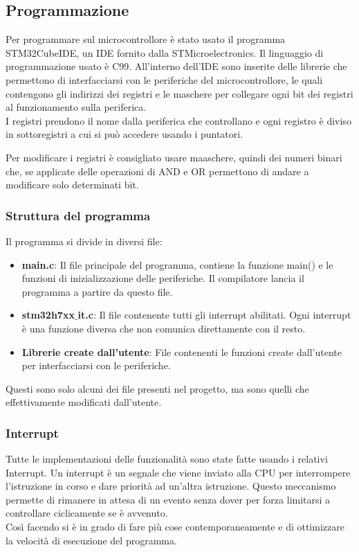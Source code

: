 \pagebreak

\subsection{Programmazione}
Per programmare sul microcontrollore è stato usato il programma STM32CubeIDE, un IDE fornito dalla STMicroelectronics. Il linguaggio di programmazione usato è C99. All'interno dell'IDE sono inserite delle librerie che permettono di interfacciarsi con le periferiche del microcontrollore, le quali contengono gli indirizzi dei registri e le maschere per collegare ogni bit dei registri al funzionamento sulla periferica.\\

I registri prendono il nome dalla periferica che controllano e ogni registro è diviso in sottoregistri a cui si può accedere usando i puntatori.

Per modificare i registri è consigliato usare maaschere, quindi dei numeri binari che, se applicate delle operazioni di AND e OR permettono di andare a modificare solo determinati bit.

\subsubsection{Struttura del programma}
Il programma si divide in diversi file:
\begin{itemize}
    \item \textbf{main.c}: Il file principale del programma, contiene la funzione main() e le funzioni di inizializzazione delle periferiche. Il compilatore lancia il programma a partire da questo file.
    \item \textbf{stm32h7xx$\_$it.c}: Il file contenente tutti gli interrupt abilitati. Ogni interrupt è una funzione diversa che non comunica direttamente con il resto.
    \item \textbf{Librerie create dall'utente}: File contenenti le funzioni create dall'utente per interfacciarsi con le periferiche.
\end{itemize}

Questi sono solo alcuni dei file presenti nel progetto, ma sono quelli che effettivamente modificati dall'utente.

\subsubsection{ Interrupt }
Tutte le implementazioni delle funzionalità sono state fatte usando i relativi Interrupt. Un interrupt è un segnale che viene inviato alla CPU per interrompere l'istruzione in corso e dare priorità ad un'altra istruzione. Questo meccanismo permette di rimanere in attesa di un evento senza dover per forza limitarsi a controllare ciclicamente se è avvenuto.\\
Così facendo si è in grado di fare più cose contemporaneamente e di ottimizzare la velocità di esecuzione del programma.\\

